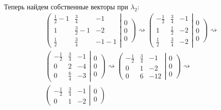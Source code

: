 Теперь найдем собственные векторы при \(\lambda_2\):
\begin{align*}
  &
  \left(
  \begin{matrix}
    \frac{1}{2} - 1 & \frac{3}{4} & -1 \\
    1 & \frac{3}{2} - 1 & -2 \\
    \frac{1}{2} & \frac{3}{4} & -1 - 1
  \end{matrix}
  \right|
  \left. \begin{matrix} 0 \\ 0 \\ 0 \end{matrix} \right)
  \rightsquigarrow
  \left(
  \begin{matrix}
    -\frac{1}{2} & \frac{3}{4} & -1 \\
    1 & \frac{1}{2} & -2 \\
    \frac{1}{2} & \frac{3}{4} & -2
  \end{matrix}
  \right|
  \left. \begin{matrix} 0 \\ 0 \\ 0 \end{matrix} \right)
  \rightsquigarrow \\
  &
  \left(
  \begin{matrix}
    -\frac{1}{2} & \frac{3}{4} & -1 \\
    0 & 2 & -4  \\
    0 & \frac{6}{4} & -3
  \end{matrix}
  \right|
  \left. \begin{matrix} 0 \\ 0 \\ 0 \end{matrix} \right)
  \rightsquigarrow
  \left(
  \begin{matrix}
    -\frac{1}{2} & \frac{3}{4} & -1 \\
    0 & 1 & -2 \\
    0 & 6 & -12
  \end{matrix}
  \right|
  \left. \begin{matrix} 0 \\ 0 \\ 0 \end{matrix} \right)
  \rightsquigarrow \\
  &
  \left(
  \begin{matrix}
    -\frac{1}{2} & \frac{3}{4} & -1 \\
    0 & 1 & -2
  \end{matrix}
  \right|
  \left. \begin{matrix} 0 \\ 0 \end{matrix} \right)

\end{align*}

